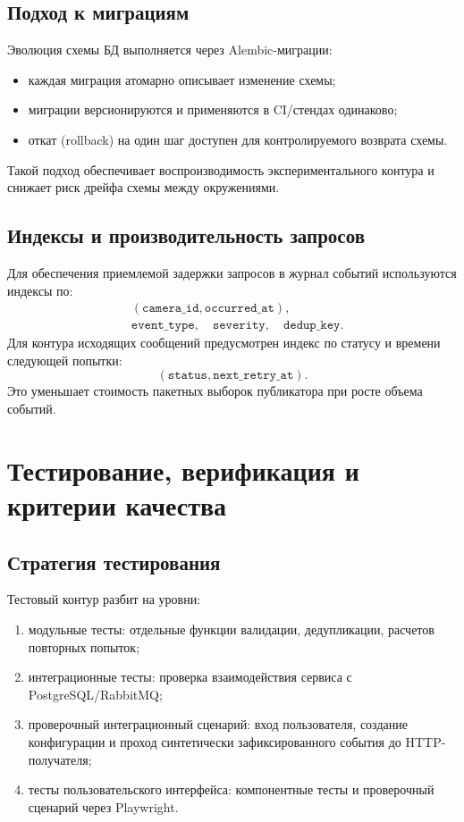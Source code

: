 \subsection{Подход к миграциям}

Эволюция схемы БД выполняется через Alembic-миграции:
\begin{itemize}
    \item каждая миграция атомарно описывает изменение схемы;
    \item миграции версионируются и применяются в CI/стендах одинаково;
    \item откат (rollback) на один шаг доступен для контролируемого возврата схемы.
\end{itemize}

Такой подход обеспечивает воспроизводимость экспериментального контура и снижает риск дрейфа схемы между окружениями.

\subsection{Индексы и производительность запросов}

Для обеспечения приемлемой задержки запросов в журнал событий используются индексы по:
\begin{equation}
\begin{aligned}
&(\texttt{camera\_id}, \texttt{occurred\_at}),\\
&\texttt{event\_type},\quad \texttt{severity},\quad \texttt{dedup\_key}.
\end{aligned}
\end{equation}
Для контура исходящих сообщений предусмотрен индекс по статусу и времени следующей попытки:
\begin{equation}
(\texttt{status}, \texttt{next\_retry\_at}).
\end{equation}
Это уменьшает стоимость пакетных выборок публикатора при росте объема событий.

\section{Тестирование, верификация и критерии качества}

\subsection{Стратегия тестирования}

Тестовый контур разбит на уровни:
\begin{enumerate}
    \item модульные тесты: отдельные функции валидации, дедупликации, расчетов повторных попыток;
    \item интеграционные тесты: проверка взаимодействия сервиса с PostgreSQL/RabbitMQ;
    \item проверочный интеграционный сценарий: вход пользователя, создание конфигурации и проход синтетически зафиксированного события до HTTP-получателя;
    \item тесты пользовательского интерфейса: компонентные тесты и проверочный сценарий через Playwright.
\end{enumerate}

